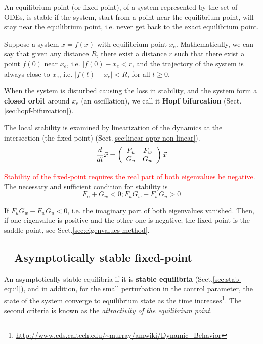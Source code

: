An equilibrium point (or fixed-point), of a system represented by the set of
ODEs, is stable if the system, start from a point near the equilibrium point,
will stay near the equilibrium point, i.e. never get back to the exact
equilibrium point.

Suppose a system $\dot{x}=f(x)$ with equilibrium point $x_e$.
Mathematically, we can say that given any distance $R$, there exist a
distance $r$ such that there exist a point $f(0)$ near $x_e$,
i.e. $|f(0)-x_e<r$, and the trajectory of the system is always close
to $x_e$, i.e. $|f(t)-x_e|<R$, for all $t\ge 0$.

When the system is disturbed causing the loss in stability, and the system form
a {\bf closed orbit} around $x_e$ (an oscillation), we call it {\bf Hopf
bifurcation} (Sect.\ref{sec:hopf-bifurcation}). 

The local stability is examined by linearization of the dynamics at the
intersection (the fixed-point) (Sect.\ref{sec:linear-appr-non-linear}).
\begin{equation}
\frac{d}{dt}\vec{x} = \left( \begin{array}{cc} 
F_u & F_w \\
G_u & G_w 
\end{array}\right) \vec{x}
\end{equation}

\textcolor{red}{Stability of the fixed-point requires the real part of both
eigenvalues be negative}. The necessary and sufficient condition for stability
is 
\begin{equation}
F_u + G_w < 0 ; F_uG_w - F_wG_u > 0
\end{equation}

If $F_uG_w - F_wG_u < 0$, i.e. the imaginary part of both eigenvalues vanished.
Then, if one eigenvalue is positive and the other one is negative; the
fixed-point is the saddle point, see Sect.\ref{sec:eigenvalues-method}.


\subsection{-- Asymptotically stable fixed-point}
\label{sec:asympt-stable}

An asymptotically stable equilibria if it is {\bf stable equilibria} (Sect.\ref{sec:stab-equil}),
and in addition, for the small perturbation in the control parameter,
the state of the system converge to equilibrium state as the time
increases\footnote{\url{http://www.cds.caltech.edu/~murray/amwiki/Dynamic_Behavior}}.
The second criteria is known as the
{\it attractivity of the equilibrium point}.

